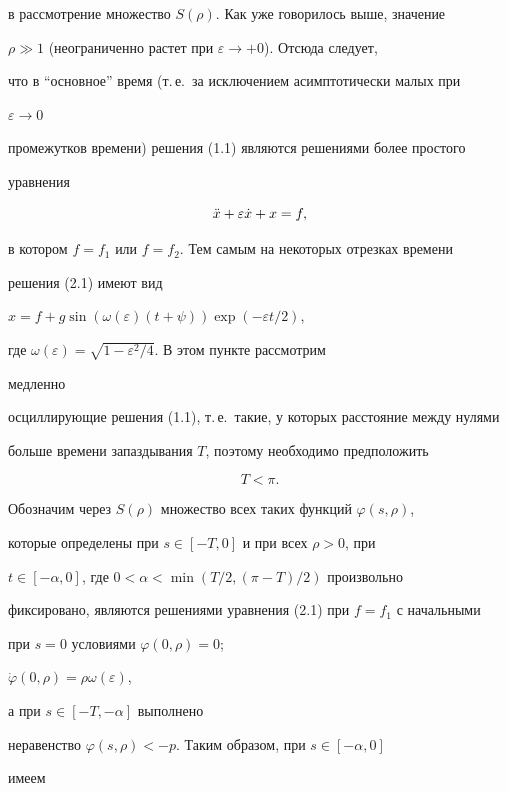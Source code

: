 в рассмотрение множество $S(\rho)$. Как уже говорилось выше, значение


$\rho \gg 1$ (неограниченно растет при $\varepsilon\to+0$). Отсюда следует,


что в ``основное'' время (т.\,е.~за исключением асимптотически малых при


$\varepsilon\to0$


промежутков времени) решения (1.1) являются решениями более простого


уравнения


\begin{equation}


\Ddot x + \varepsilon\Dot x + x = f,


\end{equation}


в котором $f=f_1$ или $f=f_2$. Тем самым на некоторых отрезках времени


решения (2.1) имеют вид


$x=f+g\sin(\omega(\varepsilon)(t+\psi))\exp(-\varepsilon t/2)$,


где $\omega(\varepsilon)=\sqrt{1-\varepsilon^2/4}$. В этом пункте рассмотрим


медленно


осциллирующие решения (1.1), т.\,е.~такие, у которых расстояние между нулями


больше времени запаздывания $T$, поэтому необходимо предположить


\begin{equation}


T < \pi.


\end{equation}


Обозначим через $S(\rho)$ множество всех таких функций $\varphi(s,\rho)$,


которые определены при $s\in[-T,0]$ и при всех $\rho>0$, при


$t\in[-\alpha,0]$, где $0<\alpha<\min(T/2, (\pi-T)/2)$ произвольно


фиксировано, являются решениями уравнения (2.1) при $f=f_1$ с начальными


при $s=0$ условиями $\varphi(0,\rho)=0$;


$\Dot\varphi(0,\rho)=\rho\omega(\varepsilon)$,


а при $s\in[-T,-\alpha]$ выполнено


неравенство $\varphi(s,\rho)<-p$. Таким образом, при $s\in[-\alpha,0]$


имеем


